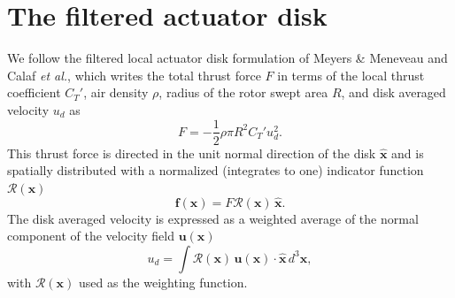 \documentclass{article}
\begin{document}
\section{The filtered actuator disk}
\label{sec:filtered-adm}
We follow the filtered local actuator disk formulation of Meyers \& Meneveau\cite{Meyers2010a} and Calaf \textit{et al.}\cite{Calaf2010a}, which writes the total thrust force $F$ in terms of the local thrust coefficient $C_T'$, air density $\rho$, radius of the rotor swept area $R$, and disk averaged velocity $u_d$ as
\begin{equation}
F = -\frac{1}{2} \rho \pi R^2 C_T' u_d^2.
\end{equation}
This thrust force is directed in the unit normal direction of the disk $\mathbf{\hat{x}}$ and is spatially distributed with a normalized (integrates to one) indicator function $\mathcal{R}(\mathbf{x})$
\begin{equation}
\mathbf{f}(\mathbf{x}) = F \mathcal{R}(\mathbf{x}) \,\mathbf{\hat{x}}.
\end{equation}
The disk averaged velocity is expressed as a weighted average of the normal component of the velocity field $\mathbf{u}(\mathbf{x})$
\begin{equation}
\label{eq:disk-average}
u_d = \int \mathcal{R}(\mathbf{x}) \, \mathbf{u}(\mathbf{x}) \cdot \mathbf{\hat{x}} \, d^3\mathbf{x},
\end{equation}
with $\mathcal{R}(\mathbf{x})$ used as the weighting function.
\end{document}
